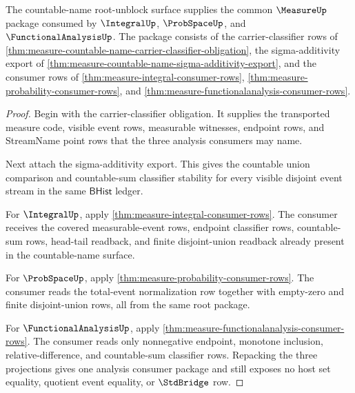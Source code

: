 \begin{theorem}
\label{thm:measure-countable-name-analysis-consumer-package}
The countable-name root-unblock surface supplies the common $\MeasureUp$
package consumed by $\IntegralUp$, $\ProbSpaceUp$, and
$\FunctionalAnalysisUp$. The package consists of the carrier-classifier rows
of \autoref{thm:measure-countable-name-carrier-classifier-obligation}, the
sigma-additivity export of
\autoref{thm:measure-countable-name-sigma-additivity-export}, and the
consumer rows of \autoref{thm:measure-integral-consumer-rows},
\autoref{thm:measure-probability-consumer-rows}, and
\autoref{thm:measure-functionalanalysis-consumer-rows}.
\end{theorem}
\begin{proof}
Begin with the carrier-classifier obligation. It supplies the transported
measure code, visible event rows, measurable witnesses, endpoint rows, and
StreamName point rows that the three analysis consumers may name.

Next attach the sigma-additivity export. This gives the countable union
comparison and countable-sum classifier stability for every visible disjoint
event stream in the same $\mathsf{BHist}$ ledger.

For $\IntegralUp$, apply \autoref{thm:measure-integral-consumer-rows}. The
consumer receives the covered measurable-event rows, endpoint classifier rows,
countable-sum rows, head-tail readback, and finite disjoint-union readback
already present in the countable-name surface.

For $\ProbSpaceUp$, apply \autoref{thm:measure-probability-consumer-rows}. The
consumer reads the total-event normalization row together with empty-zero and
finite disjoint-union rows, all from the same root package.

For $\FunctionalAnalysisUp$, apply
\autoref{thm:measure-functionalanalysis-consumer-rows}. The consumer reads
only nonnegative endpoint, monotone inclusion, relative-difference, and
countable-sum classifier rows. Repacking the three projections gives one
analysis consumer package and still exposes no host set equality, quotient
event equality, or $\StdBridge$ row.
\end{proof}
